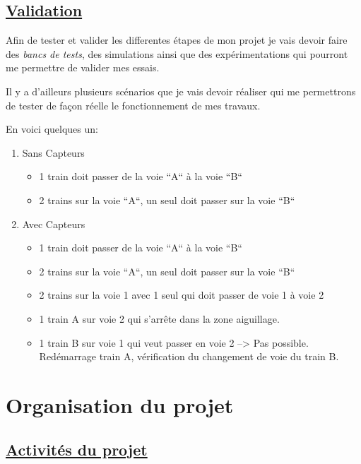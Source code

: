 \subsection{\underline{ Validation}}
\label{sec:valid}

Afin de tester et valider les differentes \'etapes de mon projet je vais
devoir faire des \emph{bancs de tests}, des simulations ainsi que des
exp\'erimentations qui pourront me permettre de valider mes essais.

Il y a d'ailleurs plusieurs sc\'enarios que je vais devoir r\'ealiser qui
me permettrons de tester de façon r\'eelle le fonctionnement de mes travaux.

En voici quelques un:

\begin{enumerate}[A]
  \item Sans Capteurs
  \begin{itemize}
    \item 1 train doit passer de la voie ``A`` à la voie ``B``
    \item 2 trains sur la voie ``A``, un seul doit passer sur la voie
       ``B``
  \end{itemize}

  \item Avec Capteurs
  \begin{itemize}
    \item 1 train doit passer de la voie ``A`` à la voie ``B``
    \item 2 trains sur la voie ``A``, un seul doit passer sur la voie ``B``
    \item 2 trains sur la voie 1 avec 1 seul qui doit passer de voie 1 à voie 2
    \item 1 train A sur voie 2 qui s'arrête dans la zone aiguillage.
    \item 1 train B sur voie 1 qui veut passer en voie 2 --> Pas
       possible. Red\'emarrage train A, v\'erification du changement de
       voie du train B.
  \end{itemize}
\end{enumerate}


\newpage
\section{Organisation du projet}
\label{sec:org_proj}

\subsection{\underline{ Activit\'es du projet}}
\label{sec:activ}


